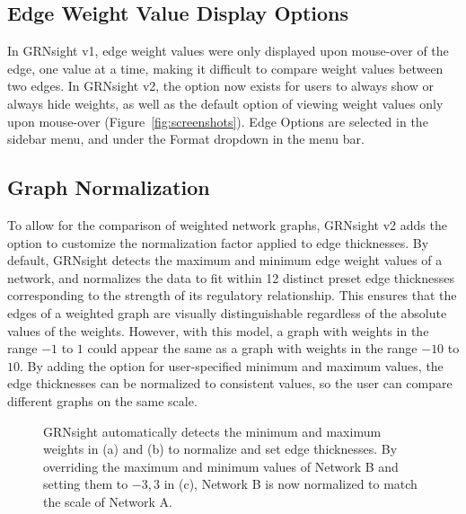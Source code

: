 \documentclass[sigconf,review]{acmart}
\begin{document}
\subsection{Edge Weight Value Display Options}
In GRNsight v1, edge weight values were only displayed upon mouse-over of the edge, one value at a time, making it difficult to compare weight values between two edges. In GRNsight v2, the option now exists for users to always show or always hide weights, as well as the default option of viewing weight values only upon mouse-over (Figure~\ref{fig:screenshots}). Edge Options are selected in the sidebar menu, and under the Format dropdown in the menu bar.

\subsection{Graph Normalization}

To allow for the comparison of weighted network graphs, GRNsight v2 adds the option to customize the normalization factor applied to edge thicknesses. By default, GRNsight detects the maximum and minimum edge weight values of a network, and normalizes the data to fit within 12 distinct preset edge thicknesses corresponding to the strength of its regulatory relationship. This ensures that the edges of a weighted graph are visually distinguishable regardless of the absolute values of the weights. However, with this model, a graph with weights in the range \(-1\) to \(1\) could appear the same as a graph with weights in the range \(-10\) to \(10\). By adding the option for user-specified minimum and maximum values, the edge thicknesses can be normalized to consistent values, so the user can compare different graphs on the same scale.

\begin{figure}[h]
    \centering
    \caption{GRNsight automatically detects the minimum and maximum weights in (a) and (b) to normalize and set edge thicknesses. By overriding the maximum and minimum values of Network B and setting them to \(-3, 3\) in (c), Network B is now normalized to match the scale of Network A.}
    \label{fig:network-screenshots}
\end{figure}
\end{document}
